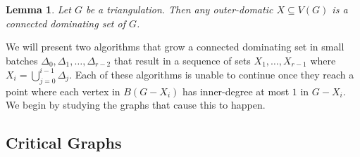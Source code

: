 \documentclass[a4paper,UKenglish, cleveref, autoref, thm-restate]{lipics-v2021}
\newcommand{\pref}[1]{(P\ref{#1})}
\newtheorem{lem}{Lemma}
\begin{document}
\begin{lem}\label{outer_domatic}
    Let $G$ be a triangulation.  Then any outer-domatic $X\subseteq V(G)$ is a connected dominating set of $G$.
\end{lem}



We will present two algorithms that grow a connected dominating set in small batches $\Delta_0,\Delta_1,\ldots,\Delta_{r-2}$ that result in a sequence of sets $X_1,\ldots,X_{r-1}$ where $X_{i}=\bigcup_{j=0}^{i-1}\Delta_j$.  Each of these algorithms is unable to continue once they reach a point where each vertex in $B(G-X_i)$ has inner-degree at most $1$ in $G-X_i$.  We begin by studying the graphs that cause this to happen.

\subsection{Critical Graphs}
\end{document}
